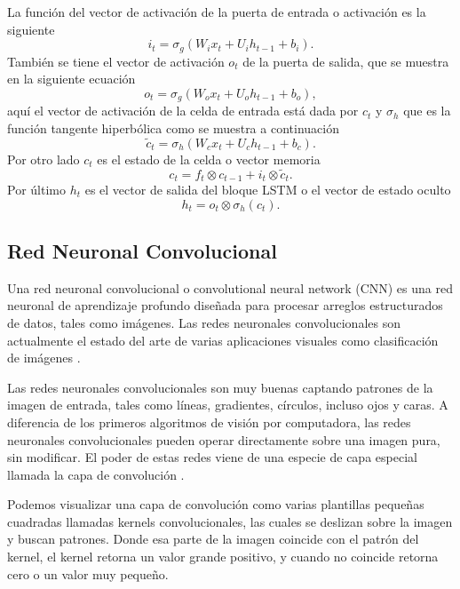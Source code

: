 La función del vector de activación de la puerta de entrada o activación es la siguiente
\begin{equation}
	i_{t}=\sigma_{g}\left(W_{i} x_{t}+U_{i} h_{t-1}+b_{i}\right).
\end{equation}
También se tiene el vector de activación $o_t$ de la puerta de salida, que se muestra en la siguiente ecuación
\begin{equation}
	o_{t}=\sigma_{g}\left(W_{o} x_{t}+U_{o} h_{t-1}+b_{o}\right),
\end{equation}
aquí el vector de activación de la celda de entrada está dada por $c_t$ y $\sigma_{h}$ que es la función tangente hiperbólica como se muestra a continuación
\begin{equation}
	\tilde{c}_{t}=\sigma_{h}\left(W_{c} x_{t}+U_{c} h_{t-1}+b_{c}\right).
\end{equation}
Por otro lado $c_t$ es el estado de la celda o vector memoria
\begin{equation}
	c_{t}=f_{t} \otimes c_{t-1}+i_{t} \otimes \tilde{c}_{t}.
\end{equation}
Por último $h_t$ es el vector de salida del bloque LSTM o el vector de estado oculto 
\begin{equation}
	h_{t}=o_{t} \otimes \sigma_{h}\left(c_{t}\right).
	\label{LSTM2}
\end{equation}


\subsection{Red Neuronal Convolucional}
Una red neuronal convolucional o convolutional neural network (CNN) es una red neuronal de aprendizaje profundo diseñada para procesar arreglos estructurados de datos, tales como imágenes. Las redes neuronales convolucionales son actualmente el estado del arte de varias aplicaciones visuales como clasificación de imágenes \parencite{ConvolutionalNeuralNetwork2019}.

Las redes neuronales convolucionales son muy buenas captando patrones de la imagen de entrada, tales como líneas, gradientes, círculos, incluso ojos y caras. A diferencia de los primeros algoritmos de visión por computadora, las redes neuronales convolucionales pueden operar directamente sobre una imagen pura, sin modificar. El poder de estas redes viene de una especie de capa especial llamada la capa de convolución \parencite{ConvolutionalNeuralNetwork2019}.

Podemos visualizar una capa de convolución como varias plantillas pequeñas cuadradas llamadas kernels convolucionales, las cuales se deslizan sobre la imagen y buscan patrones. Donde esa parte de la imagen coincide con el patrón del kernel, el kernel retorna un valor grande positivo, y cuando no coincide retorna cero o un valor muy pequeño.

